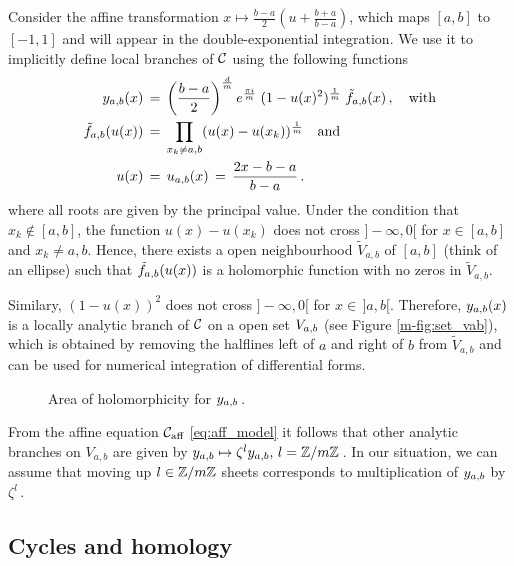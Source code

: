 \documentclass[main.tex]{subfiles}
\begin{document}
  
  Consider the affine transformation $x \mapsto \frac{b-a}{2}\left(u+\frac{b+a}{b-a}\right)$, which maps 
  $[a,b]$ to $[-1,1]$ and will appear in the double-exponential integration. \abstand
  We use it to implicitly  define local branches of $\mathcal{C}$ using the following functions
  \begin{align}\label{def:yab}
  \begin{split}
   y_{a,b}(x) \, & = \, \left(\frac{b-a}{2}\right)^{\frac{d}{m}} e^{\frac{\pi i}{m}} \; (1 - u(x)^2)^{\frac{1}{m}} \; \tilde{f}_{a,b}(x)\,, \quad \text{with} \\
   \tilde{f}_{a,b}(u(x)) \, & = \, \prod_{x_k \ne a,b} (u(x) - u(x_k))^{\frac{1}{m}} \quad \text{and} \\
   u(x) \,& = \, u_{a,b}(x) \,=\, \frac{2x-b-a}{b-a}\,.
   \end{split}
  \end{align}
  where all roots are given by the principal value. Under the condition that $x_k \not\in [a,b]$, the function $u(x)-u(x_k)$ does not cross $]\!\!-\infty,0[$
  for $x \in [a,b]$ and $x_k \ne a,b$. Hence, there exists a open neighbourhood $\tilde{V}_{a,b}$ of $[a,b]$ (think of an ellipse) such that
  $\tilde{f}_{a,b}(u(x))$ is a holomorphic function with no zeros in $\tilde{V}_{a,b}$.
  
  \medskip
  
  Similary, $(1-u(x))^2$ does not cross $]\!\!-\infty,0[$ for $x \in \,]a,b[$. Therefore, 
 $y_{a,b}(x)$ is a locally analytic branch of $\mathcal{C}$ on a open set $V_{a,b}$ (see Figure \ref{m-fig:set_vab}), which is obtained by removing the halflines left of $a$ and right of $b$ from $\tilde{V}_{a,b}$ 
  and can be used for numerical integration of differential forms.
 \begin{figure}[H]
      \begin{center}
	  
      \end{center}
    \caption{Area of holomorphicity for $y_{a,b}$\,.}
    \label{fig:set_vab}
\end{figure}
 
 From the affine equation $\mathcal{C}_{\text{aff}}$ \eqref{eq:aff_model} it follows that other analytic branches on $V_{a,b}$ are given by
      $y_{a,b} \mapsto \zeta^l y_{a,b},\, l = \mathbb{Z}/m\mathbb{Z}$\,.
  In our situation, we can assume that moving up $l \in \mathbb{Z}/m\mathbb{Z}$ sheets corresponds to multiplication of $y_{a,b}$ by $\zeta^l$\,. 

  \bigskip
  
  
  \subsection{Cycles and homology}\label{subsec:cycles_homo}
    
\end{document}
